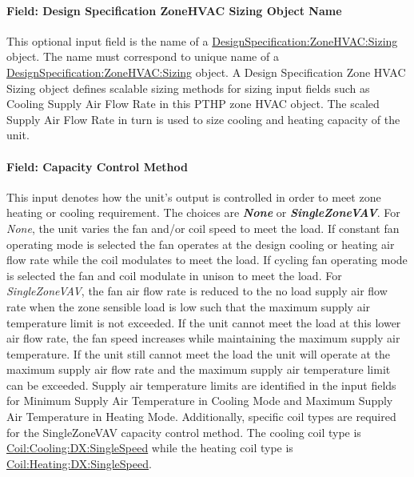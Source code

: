 \paragraph{Field: Design Specification ZoneHVAC Sizing Object Name}\label{field-design-specification-zonehvac-sizing-object-name-7}

This optional input field is the name of a \hyperref[designspecificationzonehvacsizing]{DesignSpecification:ZoneHVAC:Sizing} object. The name must correspond to unique name of a \hyperref[designspecificationzonehvacsizing]{DesignSpecification:ZoneHVAC:Sizing} object. A Design Specification Zone HVAC Sizing object defines scalable sizing methods for sizing input fields such as Cooling Supply Air Flow Rate in this PTHP zone HVAC object. The scaled Supply Air Flow Rate in turn is used to size cooling and heating capacity of the unit.

\paragraph{Field: Capacity Control Method}\label{field-capacity-control-method-3}

This input denotes how the unit's output is controlled in order to meet zone heating or cooling requirement. The choices are \textbf{\emph{None}} or \textbf{\emph{SingleZoneVAV}}. For \emph{None}, the unit varies the fan and/or coil speed to meet the load. If constant fan operating mode is selected the fan operates at the design cooling or heating air flow rate while the coil modulates to meet the load. If cycling fan operating mode is selected the fan and coil modulate in unison to meet the load. For \emph{SingleZoneVAV}, the fan air flow rate is reduced to the no load supply air flow rate when the zone sensible load is low such that the maximum supply air temperature limit is not exceeded. If the unit cannot meet the load at this lower air flow rate, the fan speed increases while maintaining the maximum supply air temperature. If the unit still cannot meet the load the unit will operate at the maximum supply air flow rate and the maximum supply air temperature limit can be exceeded. Supply air temperature limits are identified in the input fields for Minimum Supply Air Temperature in Cooling Mode and Maximum Supply Air Temperature in Heating Mode. Additionally, specific coil types are required for the SingleZoneVAV capacity control method. The cooling coil type is \hyperref[coilcoolingdxsinglespeed]{Coil:Cooling:DX:SingleSpeed} while the heating coil type is \hyperref[coilheatingdxsinglespeed]{Coil:Heating:DX:SingleSpeed}.

